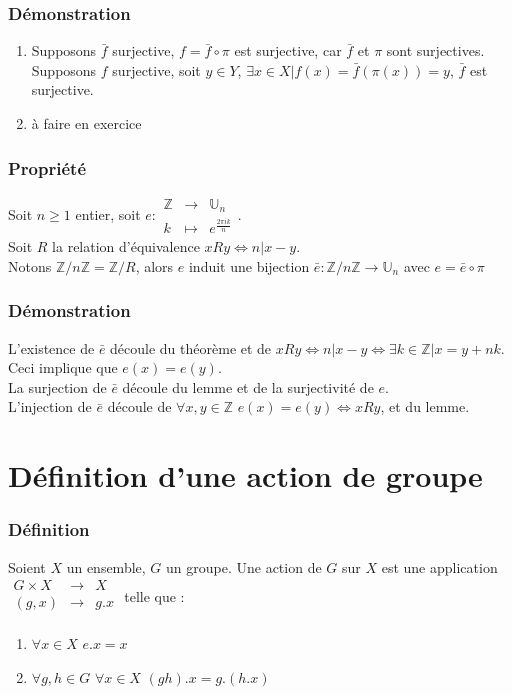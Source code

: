 \documentclass[a4paper, oneside]{report}
\theoremstyle{break}
\newcommand{\x}{\times}
\newcommand{\Z}{\mathbb{Z}}
\newcommand{\U}{\mathbb{U}}
\begin{document}
\subsubsection{Démonstration}
\begin{enumerate}

\item Supposons $\bar{f}$ surjective, $f=\bar{f}\circ \pi$ est surjective, car $\bar{f}$ et $\pi$ sont surjectives.\\

Supposons $f$ surjective, soit $y\in Y$, $\exists x \in X | f(x)=\bar{f}(\pi(x))=y$, $\bar{f}$ est surjective.
\item à faire en exercice
\end{enumerate}

\subsubsection{Propriété}
Soit $n\geq 1$ entier, soit $e:\begin{array}{lll}
 \Z &\rightarrow &\U_n\\
k&\mapsto&e^{\frac{2\pi i k}{n}}
\end{array}$.\\
Soit $R$ la relation d'équivalence $xRy\Leftrightarrow n|x-y$.\\
Notons $\Z/n\Z=\Z/R$, alors $e$ induit une bijection $\bar{e}:\Z/n\Z \rightarrow \U_n$ avec $e=\bar{e}\circ \pi$

\subsubsection{Démonstration}
L'existence de $\bar{e}$ découle du théorème et de $xRy \Leftrightarrow n|x-y \Leftrightarrow \exists k\in \Z | x=y+nk$.\\
Ceci implique que $e(x)=e(y)$.\\
La surjection de $\bar{e}$ découle du lemme et de la surjectivité de $e$.\\
L'injection de $\bar{e}$ découle de $\forall x,y\in \Z$ $e(x)=e(y)\Leftrightarrow xRy$, et du lemme.

\section{Définition d'une action de groupe}

\subsubsection{Définition}
Soient $X$ un ensemble, $G$ un groupe. Une action de $G$ sur $X$ est une application $\begin{array}{lll}
G\x X &\rightarrow & X\\
(g,x)&\rightarrow & g.x\\
\end{array}$ telle que :
\begin{enumerate}
\item $\forall x\in X$ $e.x=x$\\
\item $\forall g,h\in G$ $\forall x\in X$ $(gh).x=g.(h.x)$
\end{enumerate}
\end{document}
